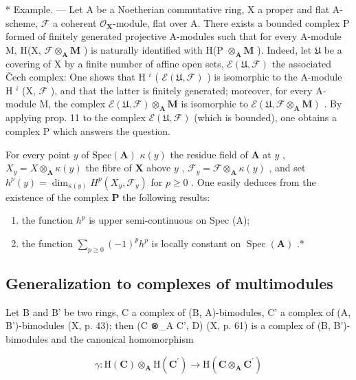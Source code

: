 * Example. --- Let A be a Noetherian commutative ring, X a proper and flat A-scheme, \(\mathcal{F}\) a coherent \(\mathcal{O}_{\mathbf{X}}\)-module, flat over A. There exists a bounded complex P formed of finitely generated projective A-modules such that for every A-module M, H(X, \(\mathcal{F} \otimes_{\mathbf{A}} \mathbf{M}\) ) is naturally identified with H(P \(\otimes_{\mathbf{A}} \mathbf{M}\) ). Indeed, let \(\mathfrak{U}\) be a covering of X by a finite number of affine open sets, \(\mathcal{E}(\mathfrak{U}, \mathcal{F})\) the associated Čech complex: One shows that H \(^{i}\) ( \(\mathcal{E}(\mathfrak{U}, \mathcal{F})\) ) is isomorphic to the A-module H \(^{i}\) (X, \(\mathcal{F}\) ), and that the latter is finitely generated; moreover, for every A-module M, the complex \(\mathcal{E}(\mathfrak{U}, \mathcal{F}) \otimes_{\mathbf{A}} \mathbf{M}\) is isomorphic to \(\mathcal{E}(\mathfrak{U}, \mathcal{F} \otimes_{\mathbf{A}} \mathbf{M})\) . By applying prop. 11 to the complex \(\mathcal{E}(\mathfrak{U}, \mathcal{F})\) (which is bounded), one obtains a complex P which answers the question.

For every point \(y\) of \(\text{Spec}(\mathbf{A})\)  \(\kappa(y)\) the residue field of \(\mathbf{A}\) at \(y\) , \(X_y = X \otimes_{\mathbf{A}} \kappa(y)\) the fibre of \(\mathbf{X}\) above \(y\) , \(\mathcal{F}_y = \mathcal{F} \otimes_{\mathbf{A}} \kappa(y)\) , and set \(h^p(y) = \dim_{\kappa(y)} H^p(X_y, \mathcal{F}_y)\) for \(p \geqslant 0\) . One easily deduces from the existence of the complex \(\mathbf{P}\) the following results:

\begin{enumerate}
\def\labelenumi{(\roman{enumi})}
\item
  the function \(h^{p}\) is upper semi-continuous on Spec (A);
\item
  the function \(\sum_{p\geqslant 0}(-1)^{p}h^{p}\) is locally constant on \(\operatorname {Spec}(\mathbf{A})\) .*
\end{enumerate}

\subsection{Generalization to complexes of multimodules}

Let B and B' be two rings, C a complex of (B, A)-bimodules, C' a complex of (A, B')-bimodules (X, p. 43); then (C ⊗\_A C', D) (X, p. 61) is a complex of (B, B')-bimodules and the canonical homomorphism

\[
\gamma : \mathrm{H} (\mathbf {C}) \otimes_ {\mathbf {A}} \mathrm{H} (\mathbf {C} ^ {\prime}) \rightarrow \mathrm{H} (\mathbf {C} \otimes_ {\mathbf {A}} \mathbf {C} ^ {\prime})
\]

